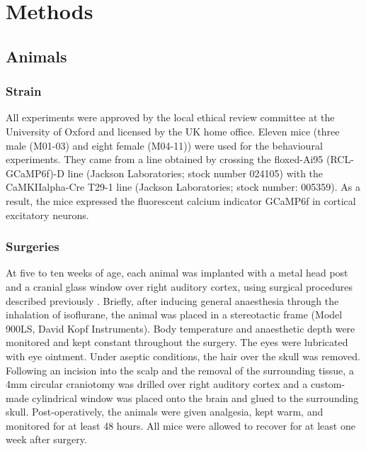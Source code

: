 \documentclass[]{report}
\theoremstyle{definition}
\theoremstyle{definition}
\theoremstyle{definition}
\theoremstyle{remark}
\begin{document}
\hypertarget{methods}{%
\chapter{Methods}\label{methods}}

\hypertarget{animals}{%
\section{Animals}\label{animals}}

\hypertarget{strain}{%
\subsection{Strain}\label{strain}}

All experiments were approved by the local ethical review committee at
the University of Oxford and licensed by the UK home office. Eleven mice
(three male (M01-03) and eight female (M04-11)) were used for the
behavioural experiments. They came from a line obtained by crossing the
floxed-Ai95 (RCL-GCaMP6f)-D line (Jackson Laboratories; stock number
024105) with the CaMKIIalpha-Cre T29-1 line (Jackson Laboratories; stock
number: 005359). As a result, the mice expressed the fluorescent calcium
indicator GCaMP6f \citep{chen2013gcamp} in cortical excitatory neurons.

\hypertarget{surgeries}{%
\subsection{Surgeries}\label{surgeries}}

At five to ten weeks of age, each animal was implanted with a metal head
post and a cranial glass window over right auditory cortex, using
surgical procedures described previously \citep{weissenberger2019licks}.
Briefly, after inducing general anaesthesia through the inhalation of
isoflurane, the animal was placed in a stereotactic frame (Model 900LS,
David Kopf Instruments). Body temperature and anaesthetic depth were
monitored and kept constant throughout the surgery. The eyes were
lubricated with eye ointment. Under aseptic conditions, the hair over
the skull was removed. Following an incision into the scalp and the
removal of the surrounding tissue, a 4mm circular craniotomy was drilled
over right auditory cortex and a custom-made cylindrical window was
placed onto the brain and glued to the surrounding skull.
Post-operatively, the animals were given analgesia, kept warm, and
monitored for at least 48 hours. All mice were allowed to recover for at
least one week after surgery.
\end{document}
